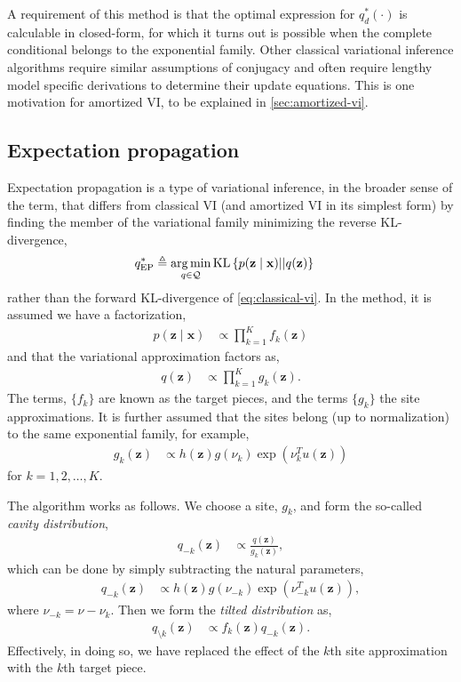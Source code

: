 A requirement of this method is that the optimal expression for $q^*_d(\cdot)$ is calculable in closed-form, for which it turns out is possible when the complete conditional belongs to the exponential family. Other classical variational inference algorithms require similar assumptions of conjugacy and often require lengthy model specific derivations to determine their update equations. This is one motivation for amortized VI, to be explained in \ref{sec:amortized-vi}.

\subsection{Expectation propagation}
Expectation propagation \citep{minka2001expectation, opper2005expectation, GelmanEtAl2014} is a type of variational inference, in the broader sense of the term, that differs from classical VI (and amortized VI in its simplest form) by finding the member of the variational family minimizing the reverse KL-divergence,
\begin{align}\label{eq:ep}
	q^*_{\text{EP}} &\triangleq \operatorname*{arg\,min}_{q\in\mathcal{Q}}\text{KL}\left\{p(\mathbf{z}\mid\mathbf{x})||q(\mathbf{z})\right\}
\end{align}
rather than the forward KL-divergence of \eqref{eq:classical-vi}. In the method, it is assumed we have a factorization,
\begin{align*}
	p(\mathbf{z}\mid\mathbf{x}) &\propto \prod^K_{k=1}f_k(\mathbf{z})
\end{align*}
and that the variational approximation factors as,
\begin{align*}
	q(\mathbf{z}) &\propto \prod^K_{k=1}g_k(\mathbf{z}).
\end{align*}
The terms, $\{f_k\}$ are known as the target pieces, and the terms $\{g_k\}$ the site approximations. It is further assumed that the sites belong (up to normalization) to the same exponential family, for example,
\begin{align*}
	g_k(\mathbf{z}) &\propto h(\mathbf{z})g(\nu_k)\exp(\nu_k^Tu(\mathbf{z}))
\end{align*}
for $k=1,2,\ldots,K$.

The algorithm works as follows. We choose a site, $g_k$, and form the so-called \emph{cavity distribution},
\begin{align*}
	q_{-k}(\mathbf{z}) &\propto \frac{q(\mathbf{z})}{g_k(\mathbf{z})},
\end{align*}
which can be done by simply subtracting the natural parameters,
\begin{align*}
	q_{-k}(\mathbf{z}) &\propto h(\mathbf{z})g(\nu_{-k})\exp(\nu_{-k}^Tu(\mathbf{z})),
\end{align*}
where $\nu_{-k}=\nu-\nu_k$. Then we form the \emph{tilted distribution} as,
\begin{align*}
	q_{\setminus k}(\mathbf{z}) &\propto f_k(\mathbf{z})q_{-k}(\mathbf{z}).
\end{align*}
Effectively, in doing so, we have replaced the effect of the $k$th site approximation with the $k$th target piece.

